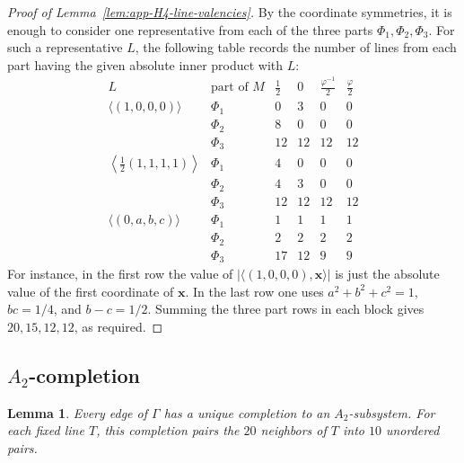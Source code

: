 \documentclass[11pt]{article}
\newtheorem{lemma}[theorem]{Lemma}
\theoremstyle{definition}
\begin{document}
\begin{proof}[Proof of Lemma~\ref{lem:app-H4-line-valencies}]
By the coordinate symmetries, it is enough to consider one representative
from each of the three parts \(\Phi_{1},\Phi_{2},\Phi_{3}\).  For such a
representative \(L\), the following table records the number of lines
from each part having the given absolute inner product with \(L\):
\[
\begin{array}{c|c|cccc}
L & \text{part of }M & \frac{1}{2} & 0 & \frac{\varphi^{-1}}{2} & \frac{\varphi}{2} \\
\hline
\langle(1,0,0,0)\rangle & \Phi_{1} & 0 & 3 & 0 & 0\\
& \Phi_{2} & 8 & 0 & 0 & 0\\
& \Phi_{3} & 12 & 12 & 12 & 12\\
\hline
\left\langle\frac{1}{2}(1,1,1,1)\right\rangle & \Phi_{1} & 4 & 0 & 0 & 0\\
& \Phi_{2} & 4 & 3 & 0 & 0\\
& \Phi_{3} & 12 & 12 & 12 & 12\\
\hline
\langle(0,a,b,c)\rangle & \Phi_{1} & 1 & 1 & 1 & 1\\
& \Phi_{2} & 2 & 2 & 2 & 2\\
& \Phi_{3} & 17 & 12 & 9 & 9
\end{array}
\]
For instance, in the first row the value of
\(|\langle(1,0,0,0),\boldsymbol{x}\rangle|\) is just the absolute value of
the first coordinate of \(\boldsymbol{x}\).  In the last row one uses
\(a^{2}+b^{2}+c^{2}=1\), \(bc=1/4\), and \(b-c=1/2\).  Summing the three part
rows in each block gives \(20,15,12,12\), as required.
\end{proof}

\subsection{\texorpdfstring{\(A_{2}\)}{A2}-completion}
\label{app:H4-A2-completion}

\begin{lemma}\label{lem:app-H4-A2-completion}
Every edge of \(\Gamma\) has a unique completion to an \(A_{2}\)-subsystem.
For each fixed line \(T\), this completion pairs the \(20\) neighbors of
\(T\) into \(10\) unordered pairs.
\end{lemma}
\end{document}
